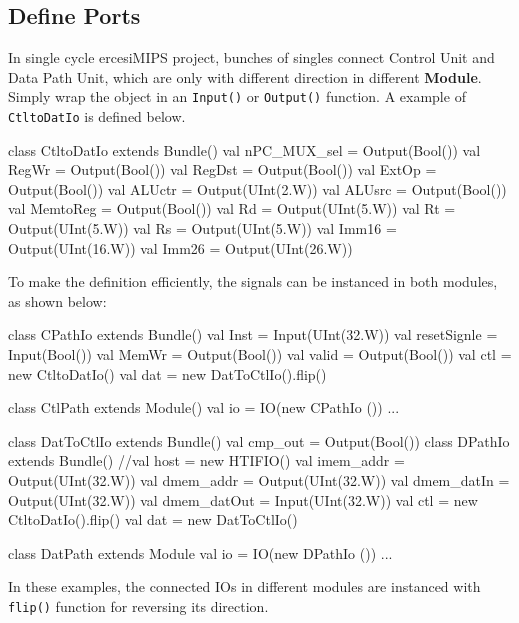 \documentclass[a4paper]{article}
\def\code#1{{\tt #1}}
\begin{document}
\subsection{Define Ports}\label{sub:io}
In single cycle ercesiMIPS project, bunches of singles connect Control Unit and Data Path Unit, which are only with different direction in different \textbf{Module}. Simply wrap the object in an \code{Input()} or \code{Output()} function. A example of \code{CtltoDatIo} is defined below.      
\begin{scala}
class CtltoDatIo extends Bundle()
{
	val nPC_MUX_sel = Output(Bool())
	val RegWr		= Output(Bool())
	val RegDst		= Output(Bool())
	val ExtOp		= Output(Bool())
	val ALUctr		= Output(UInt(2.W))
	val ALUsrc		= Output(Bool())
	val MemtoReg	= Output(Bool())
	val Rd 			= Output(UInt(5.W))
	val Rt 			= Output(UInt(5.W))
	val Rs 			= Output(UInt(5.W))
	val Imm16 		= Output(UInt(16.W))
	val	Imm26		= Output(UInt(26.W))
}
\end{scala}
To make the definition efficiently, the signals can be instanced in both modules, as shown below:
\begin{multicols}{2}
\begin{scala}
class CPathIo extends Bundle()
{
	val Inst 		= Input(UInt(32.W))
	val resetSignle = Input(Bool())
	val MemWr		= Output(Bool())
	val valid		= Output(Bool())
	val ctl 		= new CtltoDatIo()
	val dat 		= new DatToCtlIo().flip()
}

class CtlPath extends Module()
{
	val io 			= IO(new CPathIo ())
	...
}
\end{scala}
\columnbreak
\begin{scala}
class DatToCtlIo extends Bundle()
{
	val cmp_out = Output(Bool())
}
class DPathIo extends Bundle()
{
	//val host		= new HTIFIO()
	val imem_addr	= Output(UInt(32.W))
	val dmem_addr	= Output(UInt(32.W))
	val dmem_datIn	= Output(UInt(32.W))
	val dmem_datOut	= Input(UInt(32.W))
	val ctl  		= new CtltoDatIo().flip()
	val dat  		= new DatToCtlIo()
}

class DatPath extends Module {
	val io = IO(new DPathIo ())
	...
}
\end{scala}
\end{multicols}

In these examples, the connected IOs in different modules are instanced with \code{flip()}
function for reversing its direction.
\end{document}
